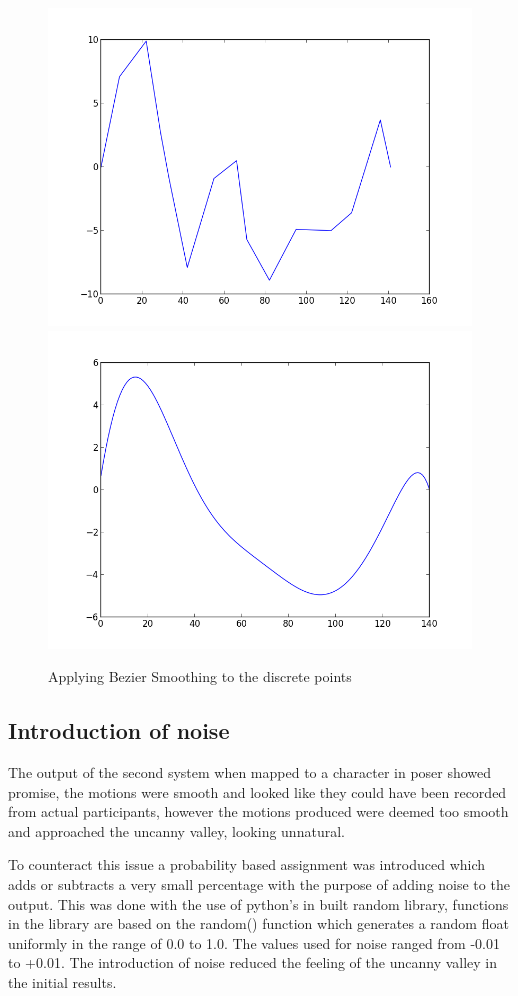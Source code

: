 \documentclass[bsc,frontabs,twoside,singlespacing,parskip]{infthesis}
\begin{document}
\begin{figure}
	\includegraphics[width=.5\textwidth]{figure_1.png}
	\includegraphics[width=.5\textwidth]{figure_2.png}
	\caption{Applying Bezier Smoothing to the discrete points}
\end{figure}

\subsection{Introduction of noise}

The output of the second system when mapped to a character in poser showed promise, the motions were smooth and looked like they could have been recorded from actual participants, however the motions produced were deemed too smooth and approached the uncanny valley, looking unnatural.

To counteract this issue a probability based assignment was introduced which adds or subtracts a very small percentage with the purpose of adding noise to the output. This was done with the use of python's in built random library, functions in the library are based on the random() function which generates a random float uniformly in the range of 0.0 to 1.0. The values used for noise ranged from -0.01 to +0.01. The introduction of noise reduced the feeling of the uncanny valley in the initial results.
\end{document}
